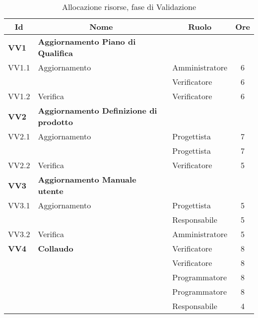 \begin{table}[H]
	\centering
	\begin{tabular}{ l l l c  }
	\hline
	\multicolumn{1}{c}{\textbf{Id}} & 
	\multicolumn{1}{c}{\textbf{Nome}} & 
	\multicolumn{1}{c}{\textbf{Ruolo}}& 
	\multicolumn{1}{c}{\textbf{Ore}} \\
	\hline
	\textbf{VV1} & \textbf{Aggiornamento Piano di Qualifica} \\
	\cline{3-4}
	VV1.1 & Aggiornamento  & Amministratore & 6\\ 
	 & & Verificatore & 6\\
    \cline{3-4}
	VV1.2 & Verifica & Verificatore &  6\\
	\hline
	\textbf{VV2} & \textbf{Aggiornamento Definizione di prodotto} \\
	\cline{3-4}
	VV2.1 & Aggiornamento  & Progettista & 7\\ 
	 & & Progettista & 7\\
    \cline{3-4}
	VV2.2 & Verifica & Verificatore &  5\\
	\hline
	\textbf{VV3} & \textbf{Aggiornamento Manuale utente} \\
	\cline{3-4}
	VV3.1 & Aggiornamento  & Progettista & 5\\ 
	 & & Responsabile & 5\\
    \cline{3-4}
	VV3.2 & Verifica & Amministratore &  5\\
	\hline
	\textbf{VV4} & \textbf{Collaudo} & Verificatore & 8\\
	 & & Verificatore & 8\\
	 & & Programmatore & 8\\
	 & & Programmatore & 8\\
	 & & Responsabile & 4\\
	\hline
	\end{tabular}
	\caption{Allocazione risorse, fase di Validazione}
	\end{table}	
	
	

